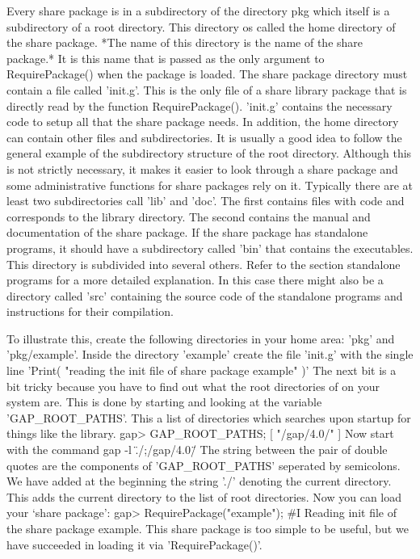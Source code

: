 Every  share  package is  in  a subdirectory of  the  directory pkg which
itself  is a subdirectory of a  {\GAP} root directory.  This directory os
called the home   directory  of the share   package.  *The  name of  this
directory is  the name of the  share  package.* It is  this name  that is
passed as  the only argument  to   RequirePackage() when the  package  is
loaded.  The share package directory must contain a file called 'init.g'.
This is the only file of a share library package that is directly read by
the  function RequirePackage().   'init.g' contains  the necessary {\GAP}
code  to setup all that  the share package  needs.  In addition, the home
directory can  contain other files and  subdirectories.  It is  usually a
good idea to follow the general example  of the subdirectory structure of
the {\GAP} root directory.  Although  this is not strictly necessary,  it
makes it easier to  look through a  share package and some administrative
functions for share packages rely  on it.  Typically  there are at  least
two  subdirectories call 'lib' and  'doc'.  The first contains files with
{\GAP} code and corresponds to the  {\GAP} library directory.  The second
contains the manual and documentation of the share package.  If the share
package  has  standalone programs,  it  should have a subdirectory called
'bin'  that contains the  executables.  This directory is subdivided into
several others.   Refer  to the section   standalone programs for  a more
detailed explanation.   In this  case  there might  also  be  a directory
called 'src'  containing the source code of  the  standalone programs and
instructions for their compilation.


To illustrate this, create  the following directories  in your home area:
'pkg' and  'pkg/example'.  Inside the directory  'example'  create the
file 'init.g' with the single line
\begintt
'Print( "reading the init file of share package example" )'
\endtt
The next bit is a  bit tricky because you have  to find out what the root
directories  of  {\GAP} on your   system are.  This   is done by starting
{\GAP} and looking   at the variable  'GAP_ROOT_PATHS'.  This  a list  of
directories which {\GAP} searches upon startup for things like the {\GAP}
library.
\begintt
gap> GAP_ROOT_PATHS;
[ "/gap/4.0/" ]
\endtt
Now start {\GAP} with the command 
\beginitems
gap -l \"./;/gap/4.0/\"
\enditems
The  string between the  pair  of double quotes    are the components  of
'GAP_ROOT_PATHS' seperated by semicolons.  We have added at the beginning
the string  './' denoting the  current directory.  This  adds the current
directory to the list of {\GAP} root directories.   Now you can load your
`share package':
\beginitems
gap> RequirePackage("example");
\#I  Reading init file of the share package example.
\enditems
This share package is too  simple to be useful, but  we have succeeded in
loading it via 'RequirePackage()'.


